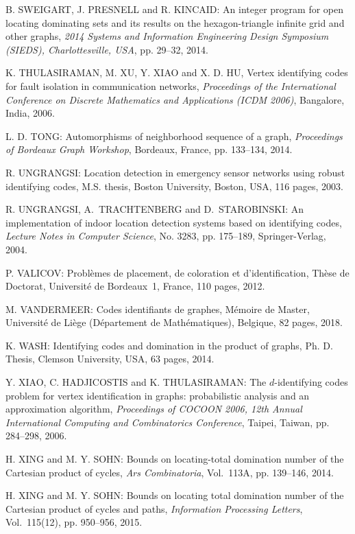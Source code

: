 \begin{thebibliography}{999}
B. SWEIGART, J. PRESNELL and R. KINCAID: An integer program for open locating dominating sets and its results on the hexagon-triangle infinite grid and other graphs, {\it 2014 Systems and Information Engineering Design Symposium (SIEDS), Charlottesville, USA}, pp. 29--32, 2014.
 
K. THULASIRAMAN, M. XU, Y. XIAO and X. D. HU, Vertex identifying codes for fault isolation in communication networks, {\it Proceedings of the International Conference on Discrete Mathematics and Applications (ICDM 2006)}, Bangalore, India, 2006.

L. D. TONG: Automorphisms of neighborhood sequence of a graph, {\it Proceedings of Bordeaux Graph Workshop}, Bordeaux, France, pp. 133--134, 2014.

R. UNGRANGSI: Location detection in emergency sensor networks using robust identifying codes, M.S. thesis, Boston University, Boston, USA, 116 pages, 2003.

R. UNGRANGSI, A.~TRACHTENBERG and D.~STAROBINSKI: An implementation of indoor location detection systems based on identifying codes, {\it Lecture Notes in Computer Science}, No. 3283, pp. 175--189, Springer-Verlag, 2004.

P. VALICOV: Probl\`emes de placement, de coloration et d'identification, Th\`ese de Doctorat, Universit\'e de Bordeaux~1, France, 110 pages, 2012.

M. VANDERMEER: Codes identifiants de graphes, M\'emoire de Master, Universit\'e de Li\`ege (D\'epartement de Math\'e\-matiques), Belgique, 82 pages, 2018.

K. WASH: Identifying codes and domination in the product of graphs, Ph. D. Thesis, Clemson University, USA, 63 pages, 2014.

Y. XIAO, C. HADJICOSTIS and K. THULASIRAMAN: The $d$-identifying codes problem for vertex identification in graphs: probabilistic analysis and an approximation algorithm, {\it Proceedings of COCOON 2006, 12th Annual International Computing and Combinatorics Conference}, Taipei, Taiwan, pp. 284--298, 2006.

H. XING and M. Y. SOHN: Bounds on locating-total domination number of the Cartesian product of cycles, {\it Ars Combinatoria}, Vol.~113A, pp. 139--146, 2014. 

H. XING and M. Y. SOHN: Bounds on locating total domination number of the Cartesian product of cycles and paths, {\it Information Processing Letters}, Vol.~115(12), pp. 950--956, 2015.
  

\end{thebibliography}
